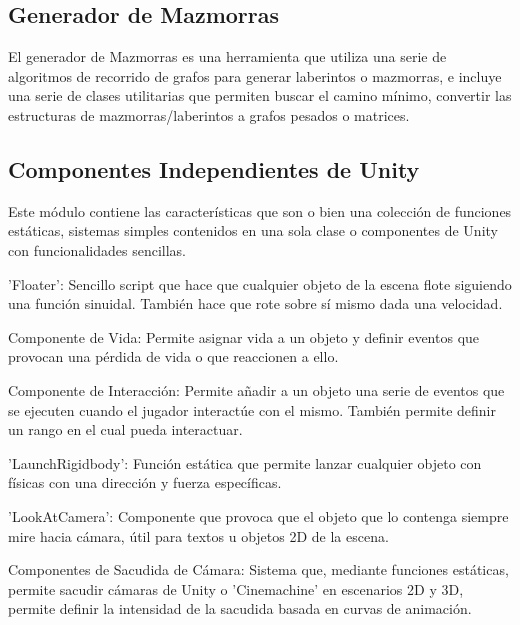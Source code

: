 \subsection{Generador de Mazmorras}
El generador de Mazmorras es una herramienta que utiliza una serie de algoritmos de recorrido de grafos para generar laberintos o mazmorras, e incluye una serie de clases
 utilitarias que permiten buscar el camino mínimo, convertir las estructuras de mazmorras/laberintos a grafos pesados o matrices.

\subsection{Componentes Independientes de Unity}
Este módulo contiene las características que son o bien una colección de funciones estáticas, sistemas simples contenidos en una sola clase o componentes de Unity 
 con funcionalidades sencillas.
\begin{compactitem}
  \item 'Floater': Sencillo script que hace que cualquier objeto de la escena flote siguiendo una función sinuidal. También hace que rote sobre sí mismo dada una velocidad.
  \item Componente de Vida: Permite asignar vida a un objeto y definir eventos que provocan una pérdida de vida o que reaccionen a ello. 
  \item Componente de Interacción: Permite añadir a un objeto una serie de eventos que se ejecuten cuando el jugador interactúe con el mismo. También permite definir un
   rango en el cual pueda interactuar. 
  \item 'LaunchRigidbody': Función estática que permite lanzar cualquier objeto con físicas con una dirección y fuerza específicas.
  \item 'LookAtCamera': Componente que provoca que el objeto que lo contenga siempre mire hacia cámara, útil para textos u objetos 2D de la escena.
  \item Componentes de Sacudida de Cámara: Sistema que, mediante funciones estáticas, permite sacudir cámaras de Unity o 'Cinemachine' en escenarios 2D y 3D, permite
   definir la intensidad de la sacudida basada en curvas de animación.
\end{compactitem}

